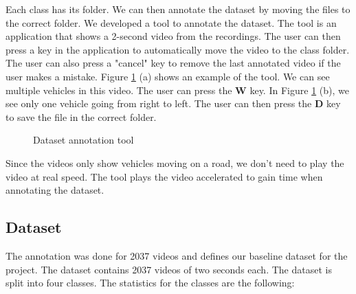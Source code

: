 Each class has its folder. We can then annotate the dataset by moving the files to the correct folder. We developed a tool to annotate the dataset. The tool is an application that shows a 2-second video from the recordings. The user can then press a key in the application to automatically move the video to the class folder. The user can also press a "cancel" key to remove the last annotated video if the user makes a mistake. Figure \ref{fig:dataset_annotation_tool} (a) shows an example of the tool. We can see multiple vehicles in this video. The user can press the \textbf{W} key. In Figure \ref{fig:dataset_annotation_tool} (b), we see only one vehicle going from right to left. The user can then press the \textbf{D} key to save the file in the correct folder.

\begin{figure}[H]
    \centering
    \qquad
    \caption{Dataset annotation tool}
    \label{fig:dataset_annotation_tool}
\end{figure}

Since the videos only show vehicles moving on a road, we don't need to play the video at real speed. The tool plays the video accelerated to gain time when annotating the dataset. 

\subsection{Dataset}

The annotation was done for 2037 videos and defines our baseline dataset for the project. The dataset contains 2037 videos of two seconds each. The dataset is split into four classes. The statistics for the classes are the following:

